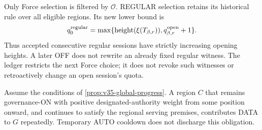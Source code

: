 Only Force selection is filtered by $\mathcal O$. REGULAR selection
retains its historical  rule over all eligible regions.
Its new lower bound is
\[
 q_0^{\rm regular}=
 \max\{\operatorname{height}(\xi(T_{\beta,r})),
                         q^{\rm open}_{\beta,r}+1\}.
\]
Thus accepted consecutive regular sessions have strictly increasing
opening heights. A later OFF does not rewrite an already fixed regular
witness. The ledger restricts the next Force choice; it does not revoke
such witnesses or retroactively change an open session's quota.

\begin{proposition}
\label{prop:v35-regional-service}
Assume the conditions of \cref{prop:v35-global-progress}. A region $C$
that remains governance-ON with positive designated-authority weight
from some position onward, and continues to satisfy the regional
serving premises, contributes DATA to $G$ repeatedly. Temporary AUTO
cooldown does not discharge this obligation.
\end{proposition}
